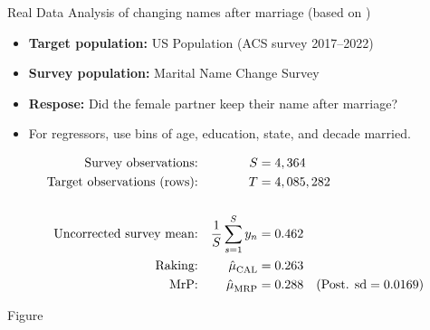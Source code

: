 \begin{frame}{Real Data}
Analysis of changing names after marriage (based on \citet{alexander:2019:namechange})

\begin{itemize}
    \item \textbf{Target population:} US Population (ACS survey 2017--2022\citet{ipumsusa})
    \item \textbf{Survey population:} Marital Name Change Survey \citep{cohen:2019:namechange}
    \item \textbf{Respose:}  Did the female partner keep their name after marriage?
    \item For regressors, use bins of age, education, state, and decade married.
\end{itemize}

$$
\begin{aligned}
    \textrm{Survey observations:} &&  S ={}& 4,364  \\
    \textrm{Target observations (rows):} &&  T ={}& 4,085,282 \\
    \\
    \textrm{Uncorrected survey mean:} && \frac{1}{S} \sum_{s=1}^S y_n ={}& 0.462 \\
    \textrm{Raking:} && \hat{\mu}^{}_{\mathrm{CAL}} ={}& 0.263 \\
    \textrm{MrP:} && \hat{\mu}^{}_{\mathrm{MRP}} ={}& 0.288
        \quad(\textrm{Post. sd} = 0.0169)\\
\end{aligned}
$$
%
\end{frame}


\begin{frame}{Figure}
\AlexanderBandFig{}
\end{frame}